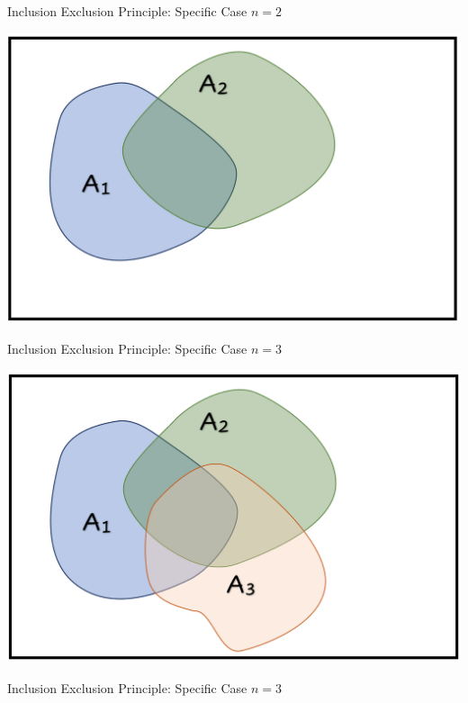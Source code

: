 \documentclass[compress]{beamer}
\begin{document}
\begin{frame}{Inclusion Exclusion Principle: Specific Case  $n=2$}
\begin{center}
\includegraphics[scale=.3]{figs/InclusionExclusion2.png}
\end{center}

	\vspace{1in}
\end{frame}




\begin{frame}{Inclusion Exclusion Principle: Specific Case  $n=3$}
\begin{center}
\includegraphics[scale=.3]{figs/InclusionExclusion3.png}
\end{center}

	\vspace{1in}
\end{frame}


\begin{frame}{Inclusion Exclusion Principle: Specific Case  $n=3$}


\end{frame}
\end{document}
